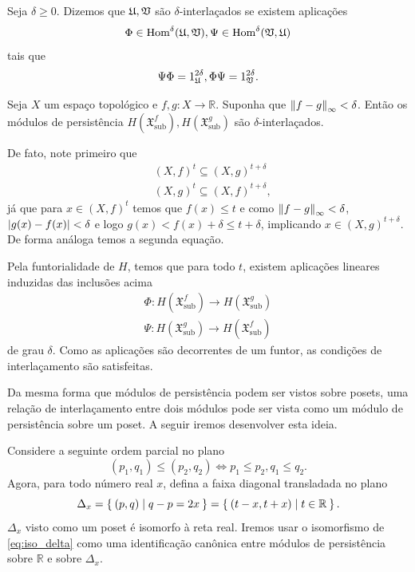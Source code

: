 \begin{defi}
    Seja $\delta \geq 0$. Dizemos que $\mathfrak{U}, \mathfrak{V}$ são $\delta$-interlaçados se
    existem aplicações 
    \begin{equation*}
        \Phi \in \text{Hom}^\delta(\mathfrak{U}, \mathfrak{V}), \Psi \in \text{Hom}^\delta(\mathfrak{V}, \mathfrak{U}) 
    \end{equation*}
    tais que
    \begin{equation*}
        \Psi\Phi = 1_{\mathfrak{U}}^{2\delta}, \Phi\Psi = 1_{\mathfrak{V}}^{2\delta}.
    \end{equation*}
\end{defi}

\begin{ex}
    Seja $X$ um espaço topológico e $f,g \colon X \to \mathbb{R}$. Suponha que $\left\lVert f-g\right\rVert_\infty 
    < \delta$. Então os módulos de persistência $H(\mathfrak{X}^f_{\text{sub}}), H(\mathfrak{X}^g_{\text{sub}})$
    são $\delta$-interlaçados.  
    
    De fato, note primeiro que 
    \begin{align*}
        & (X,f)^t \subseteq (X,g)^{t+\delta} \\
        & (X,g)^t \subseteq (X,f)^{t+\delta},
    \end{align*}
    já que para $x \in (X,f)^t$ temos que $f(x) \leq t$ e como 
    $\left\lVert f-g\right\rVert_\infty < \delta$, $\left\lvert g(x) - f(x)\right\rvert < \delta$ 
    e logo $g(x) < f(x) + \delta \leq t + \delta$, implicando 
    $x \in (X,g)^{t+\delta}$. De forma análoga temos a segunda equação.  

    Pela funtorialidade de $H$, temos que para todo $t$, existem aplicações lineares induzidas das
    inclusões acima
    \begin{align*}
        \Phi \colon H(\mathfrak{X}_{\text{sub}}^f) \to H(\mathfrak{X}_{\text{sub}}^g) \\
        \Psi \colon H(\mathfrak{X}_{\text{sub}}^g) \to H(\mathfrak{X}_{\text{sub}}^f)
    \end{align*}
    de grau $\delta$. Como as aplicações são decorrentes de um funtor, as condições de interlaçamento
    são satisfeitas.
\end{ex}

Da mesma forma que módulos de persistência podem ser vistos sobre posets, uma relação de 
interlaçamento entre dois módulos pode ser vista como um módulo de persistência sobre um poset. A seguir
iremos desenvolver esta ideia. 

Considere a seguinte ordem parcial no plano
\begin{equation*}
    (p_1, q_1) \leq (p_2, q_2) \iff p_1 \leq p_2, q_1 \leq q_2.
\end{equation*}
Agora, para todo número real $x$, defina a faixa diagonal transladada no plano
\begin{equation}\label{eq:iso_delta}
    \Delta_x = \Set{(p,q) | q-p = 2x} = \Set{(t-x, t+x) | t \in \mathbb{R}}.
\end{equation}
$\Delta_x$ visto como um poset é isomorfo à reta real. Iremos usar o isomorfismo de
\eqref{eq:iso_delta} como uma identificação canônica entre módulos de persistência
sobre $\mathbb{R}$ e sobre $\Delta_x$. 

